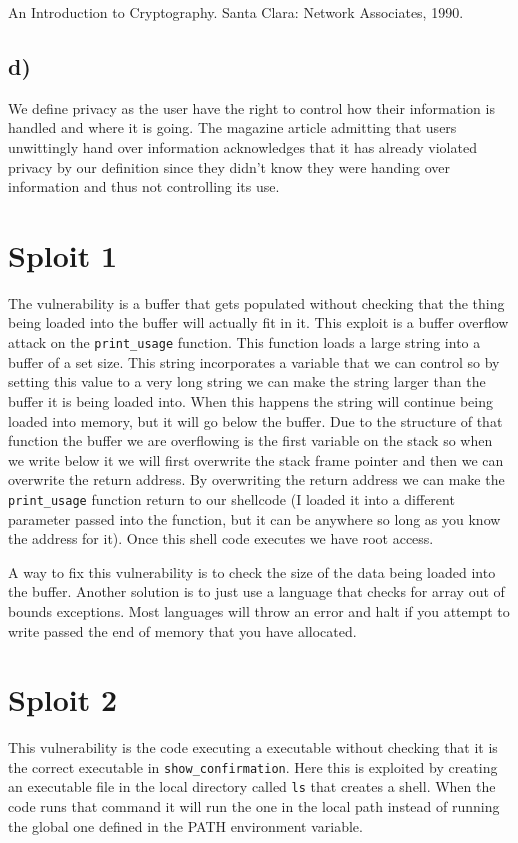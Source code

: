 \documentclass{article}
\begin{document}
An Introduction to Cryptography. Santa Clara: Network Associates, 1990.

\subsection*{d)} %
\label{sub:d_}
We define privacy as the user have the right to control how their information is handled and where it is going. The magazine article admitting that users unwittingly hand over information acknowledges that it has already violated privacy by our definition since they didn't know they were handing over information and thus not controlling its use. 


\section*{Sploit 1} %
\label{sec:sploit_1}
The vulnerability is a buffer that gets populated without checking that the thing being loaded into the buffer will actually fit in it. This exploit is a buffer overflow attack on the \texttt{print\_usage} function. This function loads a large string into a buffer of a set size. This string incorporates a variable that we can control so by setting this value to a very long string we can make the string larger than the buffer it is being loaded into. When this happens the string will continue being loaded into memory, but it will go below the buffer. Due to the structure of that function the buffer we are overflowing is the first variable on the stack so when we write below it we will first overwrite the stack frame pointer and then we can overwrite the return address. By overwriting the return address we can make the \texttt{print\_usage} function return to our shellcode (I loaded it into a different parameter passed into the function, but it can be anywhere so long as you know the address for it). Once this shell code executes we have root access.

A way to fix this vulnerability is to check the size of the data being loaded into the buffer. Another solution is to just use a language that checks for array out of bounds exceptions. Most languages will throw an error and halt if you attempt to write passed the end of memory that you have allocated.

\section*{Sploit 2} %
\label{sec:sploit_2}
This vulnerability is the code executing a executable without checking that it is the correct executable in \texttt{show\_confirmation}. Here this is exploited by creating an executable file in the local directory called \texttt{ls} that creates a shell. When the code runs that command it will run the one in the local path instead of running the global one defined in the PATH environment variable.
\end{document}
